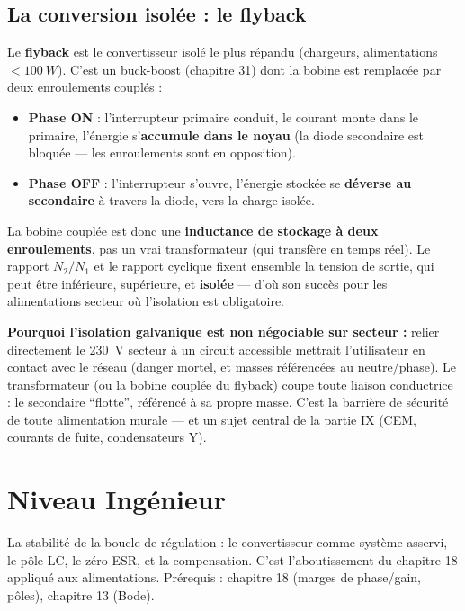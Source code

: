 \documentclass[12pt,a4paper,twoside]{book}
\begin{document}
\subsection{La conversion isolée : le flyback}

\begin{formule}
Le \textbf{flyback} est le convertisseur isolé le plus répandu (chargeurs, alimentations $< \SI{100}{W}$). C'est un buck-boost (chapitre 31) dont la bobine est remplacée par deux enroulements couplés :
\begin{itemize}[nosep]
\item \textbf{Phase ON} : l'interrupteur primaire conduit, le courant monte dans le primaire, l'énergie s'\textbf{accumule dans le noyau} (la diode secondaire est bloquée --- les enroulements sont en opposition).
\item \textbf{Phase OFF} : l'interrupteur s'ouvre, l'énergie stockée se \textbf{déverse au secondaire} à travers la diode, vers la charge isolée.
\end{itemize}
La bobine couplée est donc une \textbf{inductance de stockage à deux enroulements}, pas un vrai transformateur (qui transfère en temps réel). Le rapport $N_2/N_1$ et le rapport cyclique fixent ensemble la tension de sortie, qui peut être inférieure, supérieure, et \textbf{isolée} --- d'où son succès pour les alimentations secteur où l'isolation est obligatoire.
\end{formule}

\begin{intuition}
\textbf{Pourquoi l'isolation galvanique est non négociable sur secteur :} relier directement le \SI{230}{V} secteur à un circuit accessible mettrait l'utilisateur en contact avec le réseau (danger mortel, et masses référencées au neutre/phase). Le transformateur (ou la bobine couplée du flyback) coupe toute liaison conductrice : le secondaire ``flotte'', référencé à sa propre masse. C'est la barrière de sécurité de toute alimentation murale --- et un sujet central de la partie IX (CEM, courants de fuite, condensateurs Y).
\end{intuition}

\section{Niveau Ingénieur}

\begin{ingenieur}
La stabilité de la boucle de régulation : le convertisseur comme système asservi, le pôle LC, le zéro ESR, et la compensation. C'est l'aboutissement du chapitre 18 appliqué aux alimentations. Prérequis : chapitre 18 (marges de phase/gain, pôles), chapitre 13 (Bode).
\end{ingenieur}
\end{document}
